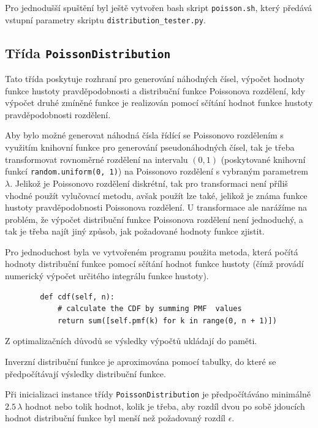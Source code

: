 \documentclass[12pt, a4paper]{article}
\begin{document}
    Pro jednodušší spuštění byl ještě vytvořen bash skript \texttt{poisson.sh}, který předává vstupní parametry skriptu
    \texttt{distribution\_tester.py}.

    \subsection{Třída \texttt{PoissonDistribution}}

    Tato třída poskytuje rozhraní pro generování náhodných čísel, výpočet hodnoty funkce hustoty pravděpodobnosti a distribuční
    funkce Poissonova rozdělení, kdy výpočet druhé zmíněné funkce je realizován pomocí sčítání hodnot funkce hustoty
    pravděpodobnosti rozdělení.

    Aby bylo možné generovat náhodná čísla řídící se Poissonovo rozdělením s využitím knihovní funkce pro generování
    pseudonáhodných čísel, tak je třeba transformovat rovnoměrné rozdělení na intervalu $(0, 1)$ (poskytované knihovní funkcí
    \texttt{random.uniform(0, 1)}) na Poissonovo rozdělení s vybraným parametrem $\lambda$.
    Jelikož je Poissonovo rozdělení diskrétní, tak pro transformaci není příliš vhodné použít vylučovací metodu, avšak
    použít lze také, jelikož je známa funkce hustoty pravděpodobnosti Poissonova rozdělení.
    U transformace ale narážíme na problém, že výpočet distribuční funkce Poissonova rozdělení není jednoduchý, a tak je
    třeba najít jiný způsob, jak požadované hodnoty funkce zjistit.

    Pro jednoduchost byla ve vytvořeném programu použita metoda, která počítá hodnoty distribuční funkce pomocí
    sčítání hodnot funkce hustoty (čímž provádí numerický výpočet určitého integrálu funkce hustoty).

    \begin{lstlisting}
        def cdf(self, n):
            # calculate the CDF by summing PMF  values
            return sum([self.pmf(k) for k in range(0, n + 1)])
    \end{lstlisting}

    \noindent Z optimalizačních důvodů se výsledky výpočtů ukládají do paměti.

    Inverzní distribuční funkce je aproximována pomocí tabulky, do které se předpočítávají výsledky distribuční funkce.

    Při inicializaci instance třídy \texttt{PoissonDistribution} je předpočítáváno minimálně $2.5\, \lambda$ hodnot nebo tolik
    hodnot, kolik je třeba, aby rozdíl dvou po sobě jdoucích hodnot distribuční funkce byl menší než požadovaný rozdíl $\epsilon$.
\end{document}
